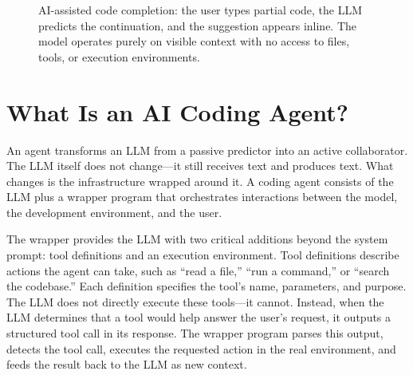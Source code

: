 \begin{figure}[t]
\centering
{}
\caption{AI-assisted code completion: the user types partial code, the LLM predicts the continuation, and the suggestion appears inline. The model operates purely on visible context with no access to files, tools, or execution environments.}
\label{fig:autocomplete}
\end{figure}

\section{What Is an AI Coding Agent?}\label{sec:agent}

An agent transforms an LLM from a passive predictor into an active collaborator. The LLM itself does not change---it still receives text and produces text. What changes is the infrastructure wrapped around it. A coding agent consists of the LLM plus a wrapper program that orchestrates interactions between the model, the development environment, and the user.

The wrapper provides the LLM with two critical additions beyond the system prompt: tool definitions and an execution environment. Tool definitions describe actions the agent can take, such as ``read a file,'' ``run a command,'' or ``search the codebase.'' Each definition specifies the tool's name, parameters, and purpose. The LLM does not directly execute these tools---it cannot. Instead, when the LLM determines that a tool would help answer the user's request, it outputs a structured tool call in its response. The wrapper program parses this output, detects the tool call, executes the requested action in the real environment, and feeds the result back to the LLM as new context.

